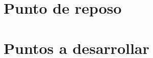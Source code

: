 \section{Punto de reposo}
\resetallcounters

\clearpage

\section{Puntos a desarrollar}
\resetallcounters

\clearpage

